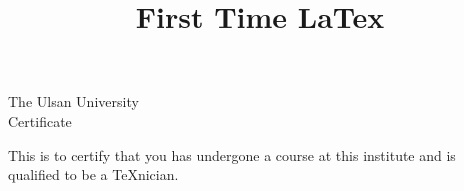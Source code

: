 \documentclass{article}
\title{First Time LaTex}
\begin{document}
\begin{center}
 The Ulsan University\\[2.75cm]
Certificate
\end{center}
\noindent This is to certify that you has undergone a course at this institute 
and is qualified to be a \TeX nician.
\end{document}
